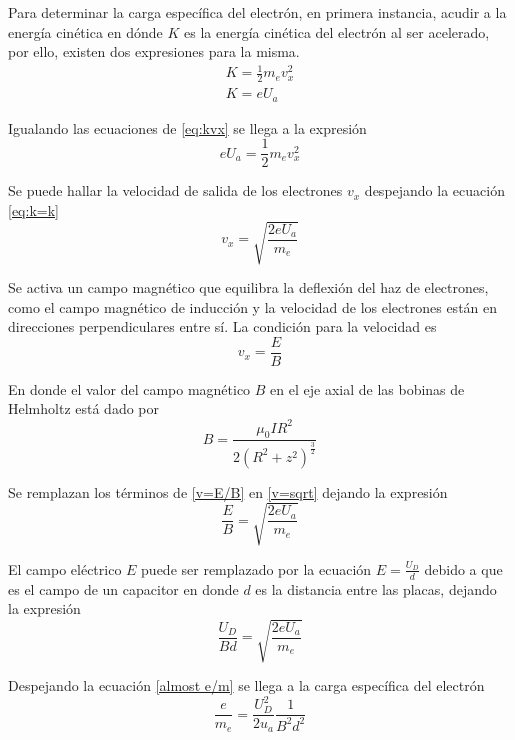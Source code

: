 Para determinar la carga específica del electrón, en primera instancia,
acudir a la energía cinética  en dónde $K$ es la energía cinética del electrón
al ser acelerado, por ello, existen dos expresiones para la misma.
\begin{equation}\label{eq:kvx}
  \begin{split}
    K=\frac{1}{2}m_ev_x^2\\
    K=eU_a
  \end{split}
\end{equation}

Igualando las ecuaciones de \ref{eq:kvx} se llega a la expresión
\begin{equation}\label{eq:k=k}
  eU_a=\frac{1}{2}m_ev_x^2
\end{equation}

Se puede hallar la velocidad de salida de los electrones $v_x$ despejando la
ecuación \ref{eq:k=k}
\begin{equation}\label{v=sqrt}
  v_x=\sqrt{\frac{2eU_a}{m_e}}
\end{equation}

Se activa un campo magnético que equilibra la deflexión del haz de electrones,
como el campo magnético de inducción  y la velocidad de los electrones están en
direcciones perpendiculares entre sí.
La condición para la velocidad es
\begin{equation}\label{v=E/B}
  v_x=\frac{E}{B}
\end{equation}

En donde el valor del campo magnético $B$ en el eje axial  de las bobinas de
Helmholtz está dado por \cite{jackson-1998}
\begin{equation}\label{eq:magnetic-field}
  B=\frac{\mu_0IR^2}{2(R^2+z^2)^{\frac{3}{2}}}
\end{equation}

Se remplazan los términos de \ref{v=E/B} en \ref{v=sqrt} dejando la expresión
\begin{equation}
  \frac{E}{B}=\sqrt{\frac{2eU_a}{m_e}}
\end{equation}

El campo eléctrico $E$ puede ser remplazado por la ecuación $E=\frac{U_D}{d}$
debido a que es el campo de un capacitor en donde $d$ es la distancia entre las
placas, dejando la expresión
\begin{equation}\label{almost e/m}
  \frac{U_D}{Bd}=\sqrt{\frac{2eU_a}{m_e}}
\end{equation}

Despejando la ecuación \ref{almost e/m} se llega a la carga específica del
electrón
\begin{equation}\label{eq:specific-charge}
  \frac{e}{m_e}=\frac{U_D^2}{2u_a}\frac{1}{B^2d^2}
\end{equation}

